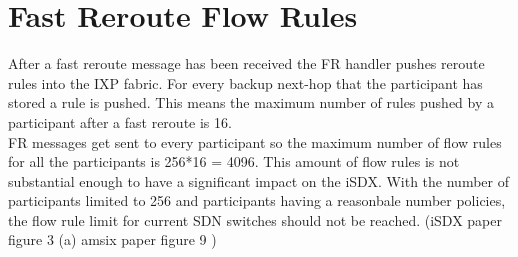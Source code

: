\section{\label{chapter4:number of flow rules}Fast Reroute Flow Rules}

After a fast reroute message has been received the FR handler pushes reroute rules into the IXP fabric. For every backup next-hop that the participant has stored a rule is pushed. This means the maximum number of rules pushed by a participant after a fast reroute is 16. \\
FR messages get sent to every participant so the maximum number of flow rules for all the participants is 256*16 = 4096. This amount of flow rules is not substantial enough to have a significant impact on the iSDX. With the number of participants limited to 256 and participants having a reasonbale number policies, the flow rule limit for current SDN switches should not be reached. (iSDX paper figure 3 (a) amsix paper figure 9 )\\

